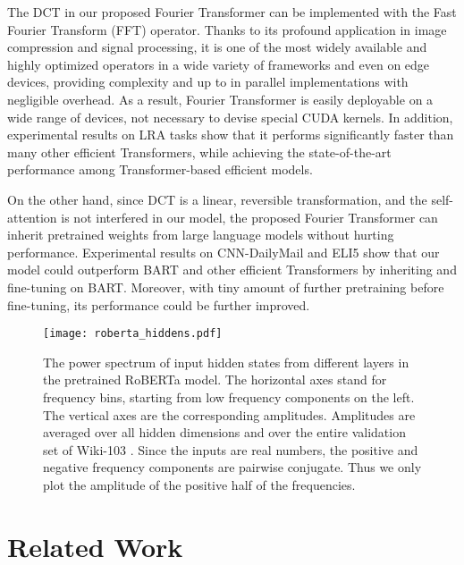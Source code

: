\documentclass[11pt]{article}
\begin{document}
The DCT in our proposed Fourier Transformer can be implemented with the Fast Fourier Transform (FFT) operator. Thanks to its profound application in image compression and signal processing, it is one of the most widely available and highly optimized operators in a wide variety of frameworks and even on edge devices, providing  complexity and up to  in parallel implementations with negligible overhead. As a result, Fourier Transformer is easily deployable on a wide range of devices, not necessary to devise special CUDA kernels. In addition, experimental results on LRA tasks show that it performs significantly faster than many other efficient Transformers, while achieving the state-of-the-art performance among Transformer-based efficient models.

On the other hand, since DCT is a linear, reversible transformation, and the self-attention is not interfered in our model, the proposed Fourier Transformer can inherit pretrained weights from large language models without hurting performance. Experimental results on CNN-DailyMail \citep{hermann2015teaching} and ELI5 \cite{eli5_lfqa} show that our model could outperform BART \cite{lewis2019bart} and other efficient Transformers by inheriting and fine-tuning on BART. Moreover, with tiny amount of further pretraining before fine-tuning, its performance could be further improved.


\begin{figure*}[ht]
\centering
\texttt{[image: roberta\_hiddens.pdf]} 
\caption{The power spectrum of input hidden states from different layers in the pretrained RoBERTa \citep{liu2019roberta} model. The horizontal axes stand for frequency bins, starting from low frequency components on the left. The vertical axes are the corresponding amplitudes. Amplitudes are averaged over all hidden dimensions and over the entire validation set of Wiki-103 \citep{merity2016pointer}. Since the inputs are real numbers, the positive and negative frequency components are pairwise conjugate. Thus we only plot the amplitude of the positive half of the frequencies. }
\label{fig: roberta_hiddens}
\end{figure*}


\section{Related Work}
\end{document}
